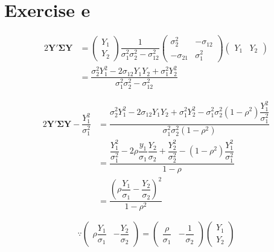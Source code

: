 \documentclass[a4papers]{ctexart}
\begin{document}
\section*{Exercise e}
\begin{alignat*}{2}
    \boldsymbol{Y}' \boldsymbol{\Sigma}\boldsymbol{Y} 
    &=\begin{pmatrix}Y_1 \\ Y_2 \end{pmatrix} \dfrac{1}{\sigma_1^2\sigma_2^2-\sigma_{12}^2}
        \begin{pmatrix}\sigma_2^2 & -\sigma_{12} \\ -\sigma_{21} & \sigma_1^2 \end{pmatrix}
        \begin{pmatrix}Y_1 & Y_2 \end{pmatrix} \\
    &= \dfrac {\sigma ^{2}_{2}Y^{2}_{1}-2\sigma _{12}Y_{1}Y_{2}+\sigma ^{2}_{1}Y^{2}_{2}}{\sigma ^{2}_{1}\sigma ^{2}_{2}-\sigma ^{2}_{12}}
    \end{alignat*}

\begin{alignat*}{2}
    \boldsymbol{Y}' \boldsymbol{\Sigma}\boldsymbol{Y} -\dfrac{Y_1^2}{\sigma_1^2}
    &= \dfrac {\sigma ^{2}_{2}Y^{2}_{1}-2\sigma _{12}Y_{1}Y_{2}+\sigma ^{2}_{1}Y^{2}_{2}-\sigma ^{2}_{1}\sigma ^{2}_{2}\left( 1-\rho ^{2}\right) \dfrac {Y^{2}_{1}}{\sigma ^{2}_{1}}}{\sigma ^{2}_{1}\sigma ^{2}_{2}\left( 1-\rho ^{2}\right) }\\
    &= \dfrac {\dfrac {Y^{2}_{1}}{\sigma ^{2}_{1}}-2\rho \dfrac {y_{1}}{\sigma _{1}}\dfrac {Y_{2}}{\sigma _{2}}+\dfrac {Y^{2}_{2}}{\sigma ^{2}_{2}}-\left( 1-\rho ^{2}\right) \dfrac {Y^{2}_{1}}{\sigma ^{2}_{1}}}{1-\rho }\\
    &= \dfrac {\left( \rho \dfrac {Y_{1}}{\sigma _{1}}-\dfrac {Y_{2}}{\sigma _{2}}\right) ^{2}}{1-\rho ^{2}}
\end{alignat*}

\[ \because
    \begin{pmatrix} \rho \dfrac {Y_{1}}{\sigma _{1}} & -\dfrac {Y_{2}}{\sigma _{2}} \end{pmatrix}
    = \begin{pmatrix} \dfrac{\rho}{\sigma_1} & -\dfrac{1}{\sigma_2} \end{pmatrix}
      \begin{pmatrix} Y_1 \\ Y_2  \end{pmatrix}
\]
\end{document}
